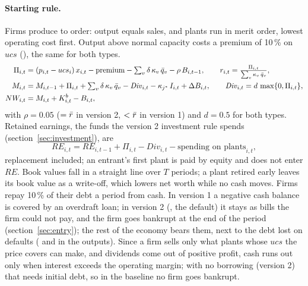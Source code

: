 \paragraph{Starting rule.} Firms produce to order: output equals sales, and plants run in
merit order, lowest operating cost first. Output above normal capacity costs a premium of
10\,\% on $ucs$ (), the same for both types.
\begin{align*}
\Pi_{i,t} &= (p_{i,t} - ucs_i)\,x_{i,t} - \text{premium} - \textstyle\sum_v \delta\,\kappa_v\,\bar q_v - \rho\,B_{i,t-1},
  \qquad r_{i,t} = \frac{\Pi_{i,t}}{\sum_v \kappa_v\,\bar q_v}, \\
M_{i,t} &= M_{i,t-1} + \Pi_{i,t} + \textstyle\sum_v \delta\,\kappa_v\,\bar q_v - \mathit{Div}_{i,t}
  - \kappa_{j^*}\,I_{i,t} + \Delta B_{i,t}, \qquad \mathit{Div}_{i,t} = d\,\max\{0, \Pi_{i,t}\}, \\
NW_{i,t} &= M_{i,t} + K^{b}_{i,t} - B_{i,t},
\end{align*}
with $\rho = 0.05$ ($= \bar r$ in version 2, $< \bar r$ in version 1) and $d = 0.5$ for both
types. Retained earnings, the funds the version 2 investment rule spends
(section~\ref{sec:investment}), are
\[
RE_{i,t} = RE_{i,t-1} + \Pi_{i,t} - \mathit{Div}_{i,t} - \text{spending on plants}_{i,t},
\]
replacement included; an entrant's first plant is paid by equity and does not enter $RE$.
Book values fall in a straight line
over $T$ periods; a plant retired early leaves its book value as a write-off, which lowers
net worth while no cash moves. Firms repay 10\,\% of their debt a period from cash. In version 1 a
negative cash balance is covered by an overdraft loan; in version 2
(, the default) it stays as bills the firm could not
pay, and the firm goes bankrupt at the end of the period (section~\ref{sec:entry}); the
rest of the economy bears them, next to the debt lost on defaults ( and
 in the outputs). Since a firm sells only what plants whose $ucs$ the
price covers can make, and dividends come out of positive profit, cash runs out only when
interest exceeds the operating margin; with no borrowing (version 2) that needs initial
debt, so in the baseline no firm goes bankrupt.

